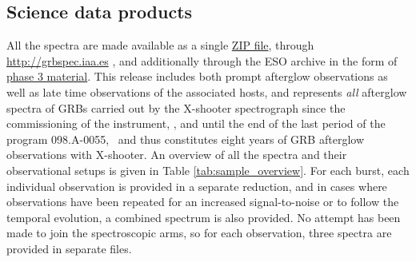 \documentclass[longauth]{aa}    %
\begin{document}
                                                                                           




\subsection{Science data products} \label{products}


All the spectra are made available as a single
\href{https://sid.erda.dk/cgi-sid/ls.py?share_id=DBuNORk1lI}{ZIP file}, through
\url{http://grbspec.iaa.es} \citep{DeUgartePostigo2014f}, and additionally through the ESO archive in the
form of \href{http://archive.eso.org/wdb/wdb/adp/phase3_main/form}{phase 3
	material}. This release includes both prompt afterglow observations as well as
late time observations of the associated hosts, and represents \textit{all}
afterglow spectra of GRBs carried out by the X-shooter spectrograph since the
commissioning of the instrument, \startdate, and until the end of the last
period of the program 098.A-0055, \termdate~and thus constitutes eight years of GRB
afterglow observations with X-shooter. An overview of all the spectra and their
observational setups is given in Table \ref{tab:sample_overview}. For each
burst, each individual observation is provided in a separate reduction, and in
cases where observations have been repeated for an increased signal-to-noise or
to follow the temporal evolution, a combined spectrum is also provided. No
attempt has been made to join the spectroscopic arms, so for each observation,
three spectra are provided in separate files.
\end{document}
